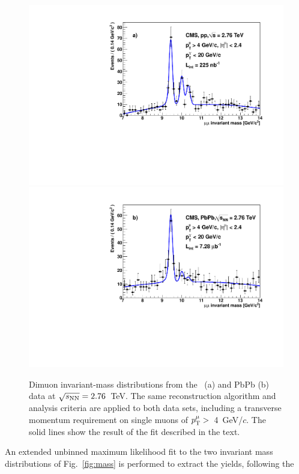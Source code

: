 \begin{figure}[hbtp]
  \begin{center}
    \includegraphics[width=0.95\linewidth]{chap_YInPbPbColl2010_figures/Mass_pp.pdf} 
    \includegraphics[width=0.95\linewidth]{chap_YInPbPbColl2010_figures/Mass_PbPb_nofit.pdf} 
    \caption{Dimuon invariant-mass distributions from the \Pp\Pp\ (a) and PbPb (b) data at $\sqrt{s_{\rm NN}} = 2.76$~TeV. 
      The same reconstruction algorithm and analysis criteria are applied to both data sets, including a transverse momentum requirement on 
      single muons of $p_{\rm T}^\mu >$~4~GeV/$c$. The solid lines show the result of the fit described in the text.}
    \label{fig:massY2010}
  \end{center}
    \vspace{-2ex}
\end{figure}
An extended unbinned maximum likelihood fit to the two invariant mass distributions of Fig.~\ref{fig:mass} is performed to extract the yields, following the 
